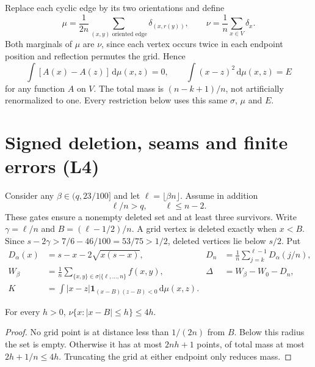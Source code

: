 \documentclass[review,supplement,hidelinks,onefignum,onetabnum]{siamart251216}
\newcommand{\ind}{\mathbf 1}
\newcommand{\dd}{\,\mathrm d}
\begin{document}
Replace each cyclic edge by its two orientations and define
\begin{equation}\label{eq:measure}
\mu=\frac1{2n}\sum_{(x,y)\text{ oriented edge}}\delta_{(x,r(y))},
\qquad \nu=\frac1n\sum_{x\in V}\delta_x.
\end{equation}
Both marginals of $\mu$ are $\nu$, since each vertex occurs twice in
each endpoint position and reflection permutes the grid. Hence
\begin{equation}\label{eq:marginals}
\int[A(x)-A(z)]\dd\mu(x,z)=0,\qquad
\int(x-z)^2\dd\mu(x,z)=E
\end{equation}
for any function $A$ on $V$. The total mass is $(n-k+1)/n$, not
artificially renormalized to one. Every restriction below uses this
same $\sigma$, $\mu$ and $E$.

\section{Signed deletion, seams and finite errors (L4)}\label{sec:deletion}
Consider any $\beta\in(q,23/100]$ and let
$\ell=\lfloor\beta n\rfloor$. Assume in addition
\begin{equation}\label{eq:cutgate}
\ell/n>q,\qquad \ell\le n-2.
\end{equation}
These gates ensure a nonempty deleted set and at least three survivors.
Write $\gamma=\ell/n$ and $B=(\ell-1/2)/n$. A grid vertex is deleted
exactly when $x<B$. Since
$s-2\gamma>7/6-46/100=53/75>1/2$, deleted vertices lie below $s/2$.
Put
\begin{align*}
D_\alpha(x)&=s-x-2\sqrt{x(s-x)},&
D_n&=\frac1n\sum_{j=k}^{\ell-1}D_\alpha(j/n),\\
W_\beta&=\frac1n\sum_{\{x,y\}\in\sigma|\{\ell,\ldots,n\}}f(x,y),&
\Delta&=W_\beta-W_0-D_n,\\
K&=\int |x-z|\ind_{(x-B)(z-B)<0}\dd\mu(x,z).
\end{align*}

\begin{lemma}\label{lem:strip}
For every $h>0$, $\nu\{x:|x-B|\le h\}\le4h$.
\end{lemma}
\begin{proof}
No grid point is at distance less than $1/(2n)$ from $B$. Below this
radius the set is empty. Otherwise it has at most $2nh+1$ points, of total mass at most
$2h+1/n\le4h$. Truncating the grid at either endpoint only reduces mass.
\end{proof}
\end{document}
